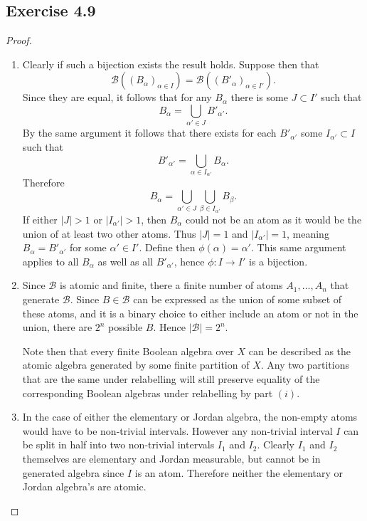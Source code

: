 \documentclass[hw_all.tex]{subfiles}
\begin{document}
\subsection{Exercise 4.9}

\begin{proof}
    \begin{enumerate}
        \item
            Clearly if such a bijection exists the result holds. Suppose then that
            \[
                \mathcal{B}((B_{\alpha})_{\alpha \in I}) = \mathcal{B}((B'_{\alpha})_{\alpha \in I'})
            .\]
            Since they are equal, it follows that for any $B_{\alpha}$ there is some $J \subset I'$ such that
            \[
                B_{\alpha} = \bigcup_{\alpha' \in J} B'_{\alpha'}
            .\]
            By the same argument it follows that there exists for each $B'_{\alpha'}$ some $I_{\alpha'} \subset I$ such that
            \[
                B'_{\alpha'} = \bigcup_{\alpha \in I_{\alpha'}} B_{\alpha}
            .\]
            Therefore
            \[
                B_{\alpha} = \bigcup_{\alpha' \in J} \bigcup_{\beta \in I_{\alpha'}} B_{\beta}
            .\]
            If either $|J| > 1$ or $|I_{\alpha'}| > 1$, then $B_{\alpha}$ could not be an atom as it would be the union of at least two other atoms. Thus $|J| = 1$ and $|I_{\alpha'}| = 1$, meaning $B_{\alpha} = B'_{\alpha'}$ for some $\alpha' \in I'$. Define then $\phi(\alpha) = \alpha'$. This same argument applies to all $B_{\alpha}$ as well as all $B'_{\alpha'}$, hence $\phi : I \to I'$ is a bijection.

        \item 
            Since $\mathcal{B}$ is atomic and finite, there a finite number of atoms $A_1, \ldots, A_n$ that generate $\mathcal{B}$. Since $B \in \mathcal{B}$ can be expressed as the union of some subset of these atoms, and it is a binary choice to either include an atom or not in the union, there are $2^n$ possible $B$. Hence $|\mathcal{B}| = 2^n$.

            Note then that every finite Boolean algebra over $X$ can be described as the atomic algebra generated by some finite partition of $X$. Any two partitions that are the same under relabelling will still preserve equality of the corresponding Boolean algebras under relabelling by part $(i)$.

        \item 
            In the case of either the elementary or Jordan algebra, the non-empty atoms would have to be non-trivial intervals. However any non-trivial interval $I$ can be split in half into two non-trivial intervals $I_1$ and $I_2$. Clearly $I_1$ and $I_2$ themselves are elementary and Jordan measurable, but cannot be in generated algebra since $I$ is an atom. Therefore neither the elementary or Jordan algebra's are atomic.


\end{enumerate}
\end{proof}
\end{document}
